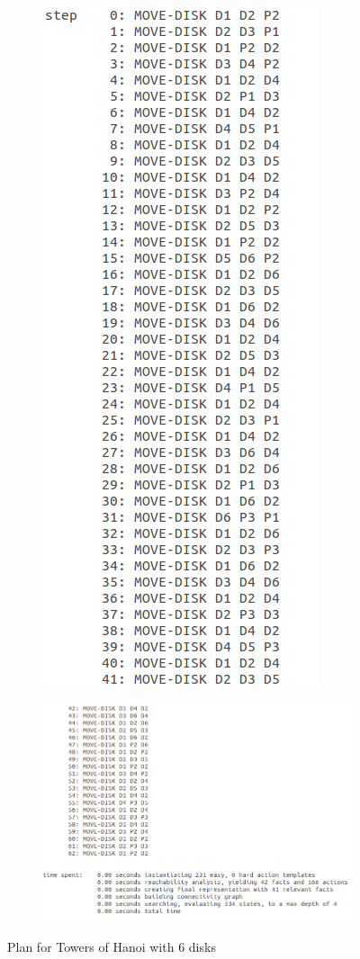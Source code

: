 \documentclass[10pt, letter]{article}
\begin{document}
\begin{figure}[h!]
\centering
\begin{subfigure}{.5\textwidth}
  \centering
  \includegraphics[scale = 0.3]{images/hanoi-6_1}
\end{subfigure}%
\begin{subfigure}{.5\textwidth}
  \centering
  \includegraphics[scale = 0.3]{images/hanoi-6_2}
\end{subfigure}%
\caption{Plan for Towers of Hanoi with 6 disks}
\label{plan6}
\end{figure}
\end{document}
